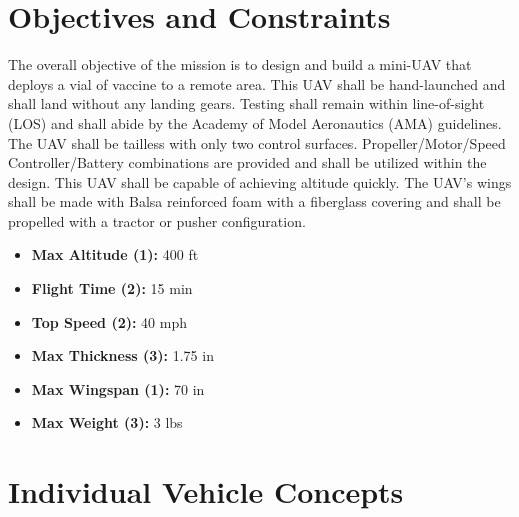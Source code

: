 \section{Objectives and Constraints}

    The overall objective of the mission is to design and build a mini-UAV that deploys a vial of vaccine to a remote area. This UAV shall be hand-launched and shall land without any landing gears. Testing shall remain within line-of-sight (LOS) and shall abide by the Academy of Model Aeronautics (AMA) guidelines. The UAV shall be tailless with only two control surfaces. Propeller/Motor/Speed Controller/Battery combinations are provided and shall be utilized within the design. This UAV shall be capable of achieving altitude quickly. The UAV's wings shall be made with Balsa reinforced foam with a fiberglass covering and shall be propelled with a tractor or pusher configuration.
    
    \begin{itemize}
        \item \textbf{Max Altitude (1):} 400 ft
        \item \textbf{Flight Time (2):} 15 min
        \item \textbf{Top Speed (2):} 40 mph
        \item \textbf{Max Thickness (3):} 1.75 in
        \item \textbf{Max Wingspan (1):} 70 in
        \item \textbf{Max Weight (3):} 3 lbs
    \end{itemize}


\section{Individual Vehicle Concepts}

